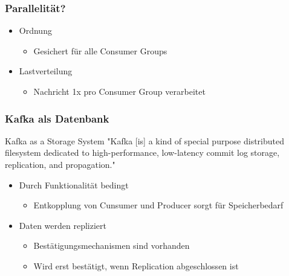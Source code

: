 \begin{frame}
\frametitle{Parallelität?}
\begin{itemize}
	\item Ordnung 
	\begin{itemize}
		\item Gesichert für alle Consumer Groups
	\end{itemize}
	\item Lastverteilung
		\begin{itemize}
		\item Nachricht 1x pro Consumer Group verarbeitet
	\end{itemize}
\end{itemize}

\end{frame}

\begin{frame}
\frametitle{Kafka als Datenbank}

\begin{block}{Kafka as a Storage System}
	"Kafka [is] a kind of special purpose distributed filesystem dedicated to high-performance, low-latency commit log storage, replication, and propagation." \cite{Kafka}
\end{block}


\begin{itemize}
	\item Durch Funktionalität bedingt
	\begin{itemize}
		\item Entkopplung  von Cunsumer und Producer sorgt für Speicherbedarf
	\end{itemize}
	\item Daten werden repliziert
	\begin{itemize}
		\item Bestätigungsmechanismen sind vorhanden
		\item Wird erst bestätigt, wenn Replication abgeschlossen ist
	\end{itemize}
\end{itemize}

\end{frame}



